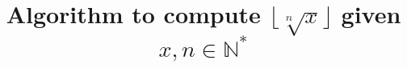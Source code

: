 \title{%
  \texorpdfstring{%
    Algorithm to compute $\lfloor \sqrt[n]{x} \rfloor$
    given $x, n \in \mathds{N}^*$%
  }{%
    Algorithm to compute the floor of the n-th root of x
    given positive integers x and n%
  }%
}
